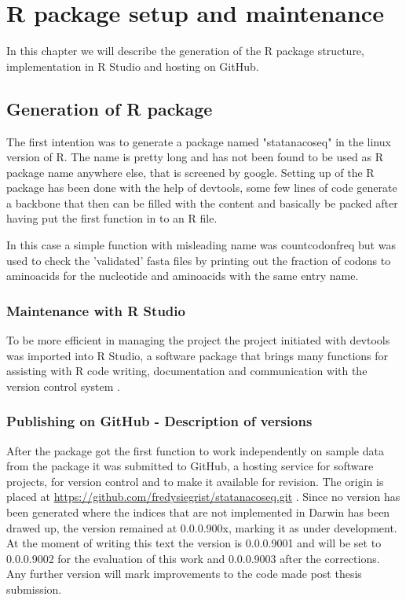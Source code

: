 \chapter{R package setup and maintenance}
In this chapter we will describe the generation of the R package structure, implementation in R Studio and hosting on GitHub.


\section{Generation of R package}
The first intention was to generate a package named "statanacoseq" in the linux version of R. The name is pretty long and has not been found to be used as R package name anywhere else, that is screened by google.
Setting up of the R package has been done with the help of devtools, some few lines of code generate a backbone that then can be filled with the content and basically be packed after having put the first function in to an R file. 

  

In this case a simple function with misleading name was countcodonfreq but was used to check the 'validated' fasta files by printing out the fraction of codons to aminoacids for the nucleotide and aminoacids with the same entry name. 
  

\subsection{Maintenance with R Studio}
To be more efficient in managing the project the project initiated with devtools was imported into R Studio, a software package that brings many functions for assisting with R code writing, documentation and communication with the version control system \cite{Rstudio2015}. 

\subsection{Publishing on GitHub - Description of versions}
After the package got the first function to work independently on sample data from the package it was submitted to GitHub, a hosting service for software projects, for version control and to make it available for revision. The origin is placed at \href{https://github.com/fredysiegrist/statanacoseq.git}{https://github.com/fredysiegrist/statanacoseq.git} \cite{Charles2013}. Since no version has been generated where the indices that are not implemented in Darwin has been drawed up, the version remained at 0.0.0.900x, marking it as under development. At the moment of writing this text the version is 0.0.0.9001 and will be set to 0.0.0.9002 for the evaluation of this work and 0.0.0.9003 after the corrections. Any further version will mark improvements to the code made post thesis submission.

